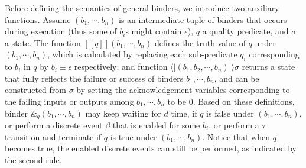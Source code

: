 \documentclass{llncs}
\newcommand{\pstop}{\epsilon}
\newcommand{\seman}[1]{[\![#1 ]\!]}
\newcommand{\rec}[1]{\langle\!|(#1)|\!\rangle}
\begin{document}
Before defining the semantics of general binders,
we introduce two auxiliary functions. Assume
$(b_1, \cdots,  b_n)$ is
an intermediate tuple of binders that occurs during execution (thus some of $b_i$s might contain
$\pstop$), $q$ a quality predicate, and $\sigma$ a state. The function
$\seman{q}(b_1, \cdots,  b_n)$ defines the truth value of $q$ under $(b_1, \cdots,  b_n)$, which is
calculated by replacing each sub-predicate $q_i$ corresponding to $b_i$ in $q$ by $b_i \equiv \pstop$ respectively;
and  function $\rec{b_1, b_2, \cdots, b_n} \sigma$ returns a state
that fully reflects the failure or success of binders $b_1, \cdots, b_n$, and can be
constructed from $\sigma$ by setting
the acknowledgement variables
corresponding to the failing inputs or outputs among $b_1, \cdots, b_n$ to be $0$.
Based on these definitions, binder
$\&_q(b_1, \cdots, b_n)$ may keep waiting for $d$ time, if $q$ is false under
$(b_1, \cdots,  b_n)$, or perform a discrete event $\beta$ that is enabled for some $b_i$, or perform a $\tau$ transition and
 terminate if $q$ is true under $(b_1, \cdots,  b_n)$. Notice that when $q$ becomes true, the enabled discrete events  can still be performed, as indicated by the second rule.
\end{document}
